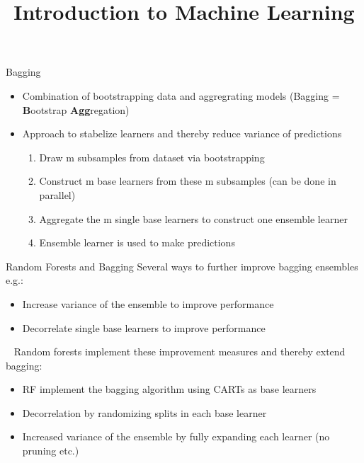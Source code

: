 




\newcommand{\titlefigure}{figure_man/forest.png}
\newcommand{\learninggoals}{
\item Understand random forests as extension of bagging
\item Understand the algorithm of random forests
\item Understand the performance evaluation of random forests
\item Understand the (dis-)advantages of random forests}

\title{Introduction to Machine Learning}
\date{}




\sloppy


\begin{vbframe}{Bagging}
\begin{itemize}
  \item Combination of bootstrapping data and aggregrating models (Bagging = \textbf{B}ootstrap \textbf{Agg}regation)
  \item Approach to stabelize learners and thereby reduce variance of predictions
\begin{enumerate}
  \item Draw m subsamples from dataset via bootstrapping
  \item Construct m base learners from these m subsamples (can be done in parallel)
  \item Aggregate the m single base learners to construct one ensemble learner
  \item Ensemble learner is used to make predictions
\end{enumerate}
\end{itemize}
\end{vbframe}


\begin{vbframe}{Random Forests and Bagging}
Several ways to further improve bagging ensembles e.g.: 
\begin{itemize}
  \item Increase variance of the ensemble to improve performance
  \item Decorrelate single base learners to improve performance
\end{itemize} 
\ \newline
Random forests implement these improvement measures and thereby extend bagging:
\begin{itemize}
  \item RF implement the bagging algorithm using CARTs as base learners
  \item Decorrelation by randomizing splits in each base learner
  \item Increased variance of the ensemble by fully expanding each learner (no pruning etc.)
\end{itemize}
\end{vbframe}


